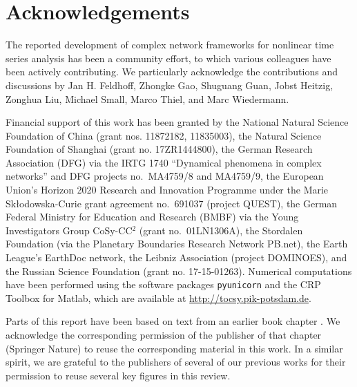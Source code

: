 \documentclass[3p,sort&compress]{elsarticle}
\begin{document}














\section*{Acknowledgements}
The reported development of complex network frameworks for nonlinear time series analysis has been a community effort, to which various colleagues have been actively contributing. We particularly acknowledge the contributions and discussions by Jan H. Feldhoff, Zhongke Gao, Shuguang Guan, Jobst Heitzig, Zonghua Liu, Michael Small, Marco Thiel, and Marc Wiedermann.

Financial support of this work has been granted by the National Natural Science Foundation of China (grant nos. 11872182, 11835003), the Natural Science Foundation of Shanghai (grant no. 17ZR1444800), the German Research Association (DFG) via the IRTG 1740 ``Dynamical phenomena in complex networks'' and DFG projects no.~MA4759/8 and MA4759/9, the European Union's Horizon 2020 Research and Innovation Programme under the Marie Sk{\l}odowska-Curie grant agreement no.~691037 (project QUEST), the German Federal Ministry for Education and Research (BMBF) via the Young Investigators Group CoSy-CC$^2$ (grant no.~01LN1306A), the Stordalen Foundation (via the Planetary Boundaries Research Network PB.net), the Earth League's EarthDoc network, the Leibniz Association (project DOMINOES), and the Russian Science Foundation (grant no. 17-15-01263). Numerical computations have been performed using the software packages \texttt{pyunicorn} \cite{Donges2015} and the CRP Toolbox for Matlab, which are available at \url{http://tocsy.pik-potsdam.de}.

Parts of this report have been based on text from an earlier book chapter \cite{Donner2015RPBook}. We acknowledge the corresponding permission of the publisher of that chapter (Springer Nature) to reuse the corresponding material in this work. In a similar spirit, we are grateful to the publishers of several of our previous works for their permission to reuse several key figures in this review.





\end{document}
